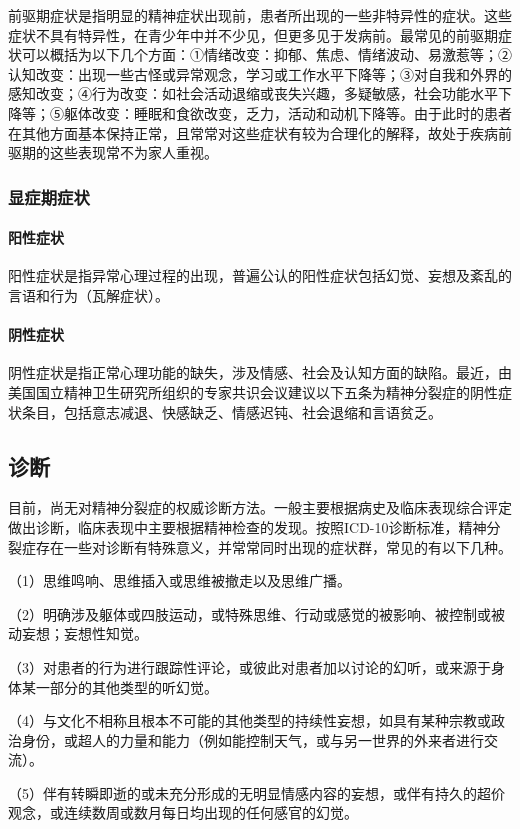 前驱期症状是指明显的精神症状出现前，患者所出现的一些非特异性的症状。这些症状不具有特异性，在青少年中并不少见，但更多见于发病前。最常见的前驱期症状可以概括为以下几个方面：①情绪改变：抑郁、焦虑、情绪波动、易激惹等；②认知改变：出现一些古怪或异常观念，学习或工作水平下降等；③对自我和外界的感知改变；④行为改变：如社会活动退缩或丧失兴趣，多疑敏感，社会功能水平下降等；⑤躯体改变：睡眠和食欲改变，乏力，活动和动机下降等。由于此时的患者在其他方面基本保持正常，且常常对这些症状有较为合理化的解释，故处于疾病前驱期的这些表现常不为家人重视。

\subsubsection{显症期症状}
\paragraph{阳性症状}

阳性症状是指异常心理过程的出现，普遍公认的阳性症状包括幻觉、妄想及紊乱的言语和行为（瓦解症状）。
\paragraph{阴性症状}

阴性症状是指正常心理功能的缺失，涉及情感、社会及认知方面的缺陷。最近，由美国国立精神卫生研究所组织的专家共识会议建议以下五条为精神分裂症的阴性症状条目，包括意志减退、快感缺乏、情感迟钝、社会退缩和言语贫乏。

\subsection{诊断}

目前，尚无对精神分裂症的权威诊断方法。一般主要根据病史及临床表现综合评定做出诊断，临床表现中主要根据精神检查的发现。按照ICD-10诊断标准，精神分裂症存在一些对诊断有特殊意义，并常常同时出现的症状群，常见的有以下几种。

（1）思维鸣响、思维插入或思维被撤走以及思维广播。

（2）明确涉及躯体或四肢运动，或特殊思维、行动或感觉的被影响、被控制或被动妄想；妄想性知觉。

（3）对患者的行为进行跟踪性评论，或彼此对患者加以讨论的幻听，或来源于身体某一部分的其他类型的听幻觉。

（4）与文化不相称且根本不可能的其他类型的持续性妄想，如具有某种宗教或政治身份，或超人的力量和能力（例如能控制天气，或与另一世界的外来者进行交流）。

（5）伴有转瞬即逝的或未充分形成的无明显情感内容的妄想，或伴有持久的超价观念，或连续数周或数月每日均出现的任何感官的幻觉。

